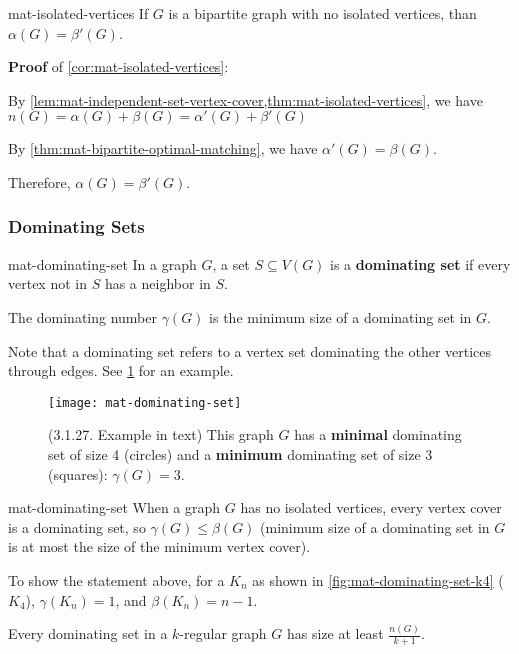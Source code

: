 \documentclass[../src/handouts/main.tex]{subfiles}
\begin{document}
\begin{corollary}{}{mat-isolated-vertices}
  If $G$ is a bipartite graph with no isolated vertices, than $\alpha(G) = \beta'(G)$.
\end{corollary}

\textbf{Proof} of \cref{cor:mat-isolated-vertices}:

\begin{enumerate*}
  \item By \cref{lem:mat-independent-set-vertex-cover,thm:mat-isolated-vertices}, we have
    $n(G) = \alpha(G) + \beta(G) = \alpha'(G) + \beta'(G)$

  \item By \cref{thm:mat-bipartite-optimal-matching}, we have
    $\alpha'(G) = \beta(G)$.

  \item Therefore, $\alpha(G) = \beta'(G)$.
\end{enumerate*}

\subsubsection{Dominating Sets}

\begin{definition}{}{mat-dominating-set}
  In a graph $G$, a set $S \subseteq V(G)$ is a \textbf{dominating set} if every vertex not in $S$ has a neighbor in $S$.

  The dominating number $\gamma(G)$ is the minimum size of a dominating set in $G$.
\end{definition}

Note that a dominating set refers to a vertex set dominating the other vertices through edges. See \cref{fig:mat-dominating-set} for an example.

\begin{figure}[htbp]
  \centering
  \texttt{[image: mat-dominating-set]}
  \caption{(3.1.27. Example in text) This graph $G$ has a \textbf{minimal} dominating set of size 4 (circles) and a \textbf{minimum} dominating set of size 3 (squares): $\gamma(G)=3$.}
  \label{fig:mat-dominating-set}
\end{figure}

\begin{remark}{}{mat-dominating-set}
  When a graph $G$ has no isolated vertices, every vertex cover is a dominating set, so $\gamma(G) \leq \beta(G)$ (minimum size of a dominating set in $G$ is at most the size of the minimum vertex cover).

  To show the statement above, for a $K_n$ as shown in \cref{fig:mat-dominating-set-k4} ($K_4$), $\gamma \left( K_n \right) = 1$, and $\beta \left( K_n \right) = n - 1$.

  Every dominating set in a $k$-regular graph $G$ has size at least $\frac{n(G)}{k + 1}$.
\end{remark}
\end{document}
